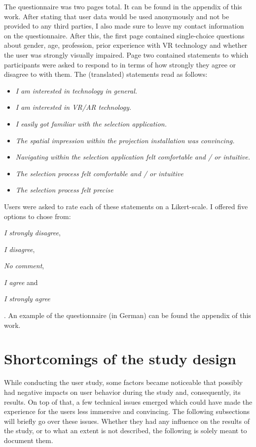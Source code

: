 The questionnaire was two pages total. It can be found in the appendix of this work. After stating that user data would be used anonymously and not be provided to any third parties, I also made sure to leave my contact information on the questionnaire. After this, the first page contained single-choice questions about gender, age, profession, prior experience with VR technology and whether the user was strongly visually impaired. Page two contained statements to which participants were asked to respond to in terms of how strongly they agree or disagree to with them. The (translated) statements read as follows:

\begin{itemize}
	\item \textit{I am interested in technology in general.}
	\item \textit{I am interested in VR/AR technology.}
	\item \textit{I easily got familiar with the selection application.}
	\item \textit{The spatial impression within the projection installation was convincing.}
	\item \textit{Navigating within the selection application felt comfortable and / or intuitive.}
	\item \textit{The selection process felt comfortable and / or intuitive}
	\item \textit{The selection process felt precise}
\end{itemize}

Users were asked to rate each of these statements on a Likert-scale. I offered five options to chose from:
\begin{enumerate*}
	\item \textit{I strongly disagree},
	\item \textit{I disagree},
	\item \textit{No comment},
	\item \textit{I agree} and
	\item \textit{I strongly agree}
\end{enumerate*}.
An example of the questionnaire (in German) can be found the appendix of this work.

	\section{Shortcomings of the study design}
	\label{sec:shortcomings_of_the_study_design}
While conducting the user study, some factors became noticeable that possibly had negative impacts on user behavior during the study and, consequently, its results. On top of that, a few technical issues emerged which could have made the experience for the users less immersive and convincing. The following subsections will briefly go over these issues. Whether they had any influence on the results of the study, or to what an extent is not described, the following is solely meant to document them.

